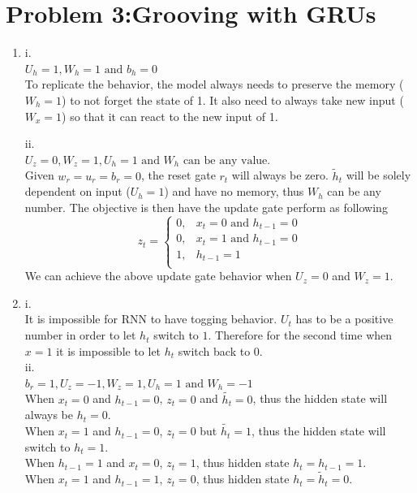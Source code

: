 \documentclass[10pt]{article}
\begin{document}
\section*{Problem 3:Grooving with GRUs}
\begin{enumerate}[label=(\alph*)]
\item
i.\\
$\boxed{U_h = 1, W_h = 1 \text{ and } b_h = 0}$\\
To replicate the behavior, the model always needs to preserve the memory ($W_h = 1$) to not forget the state of 1. It also need to always take new input ($W_x = 1$) so that it can react to the new input of 1.\par
ii.\\
$\boxed{U_z = 0, W_z = 1, U_h = 1 \text{ and } W_h \text{ can be any value.}}$\\
Given $w_r = u_r = b_r = 0$, the reset gate $r_t$ will always be zero. $\tilde{h}_t$ will be solely dependent on input ($U_h = 1$) and have no memory, thus $W_h$ can be any number. The objective is then have the update gate perform as following
$$z_t = \begin{cases}
 0, & x_t = 0 \text{ and } h_{t-1} = 0\\
 0, & x_t = 1 \text{ and } h_{t-1} = 0\\
 1, & h_{t-1} = 1\\
\end{cases}$$
We can achieve the above update gate behavior when $U_z=0$ and $W_z = 1$.
\item
i.\\
It is impossible for RNN to have togging behavior.
$U_t$ has to be a positive number in order to let $h_t$ switch to $1$.
Therefore for the second time when $x = 1$ it is impossible to let $h_t$ switch back to $0$.\\

ii.\\
$\boxed{b_r = 1, U_z = -1, W_z = 1, U_h = 1 \text{ and }W_h = -1}$\\
When $x_t=0$ and $h_{t-1} = 0$, $z_t = 0$ and $\tilde{h_t} = 0$, thus the hidden state will always be $h_t = 0$.\\
When $x_t=1$ and $h_{t-1} = 0$, $z_t = 0$ but $\tilde{h_t} = 1$, thus the hidden state will switch to $h_t = 1$.\\
When $h_{t-1}=1$ and $x_t=0$, $z_t = 1$, thus hidden state $h_t = h_{t-1} = 1$.\\
When $x_t=1$ and $h_{t-1} = 1$, $z_t = 0$, thus hidden state $h_t = \tilde{h}_t = 0$.\\


\end{enumerate}
\end{document}
